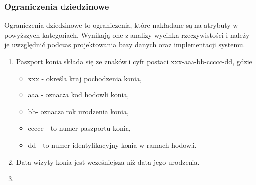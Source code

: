 \documentclass[12pt,twoside]{report}
\begin{document}
\subsubsection{Ograniczenia dziedzinowe}
Ograniczenia dziedzinowe to ograniczenia, które nakładane są na atrybuty w powyższych kategoriach. Wynikają one z analizy wycinka rzeczywistości i należy je uwzględnić podczas projektowania bazy danych oraz implementacji systemu.
\begin{enumerate}[start=1,label={\bfseries OGR\textbackslash 00\arabic*}]
	\item Paszport konia składa się ze znaków i cyfr postaci xxx-aaa-bb-ccccc-dd, gdzie
	\begin{itemize} 
		\item xxx - określa kraj pochodzenia konia,  
		\item aaa - oznacza kod hodowli konia, 
		\item bb- oznacza rok urodzenia konia, 
		\item ccccc - to numer paszportu konia, 
		\item dd - to numer identyfikacyjny konia w ramach hodowli.
		\end{itemize}
	\item Data wizyty konia jest wcześniejsza niż data jego urodzenia.
	\item 
\end{enumerate}
\newpage
\end{document}
